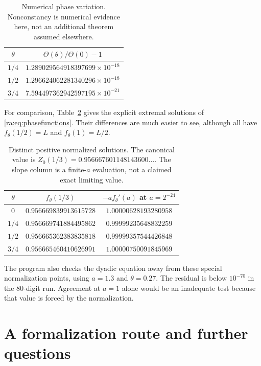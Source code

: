 \documentclass[11pt,a4paper,oneside,openany]{book}
\numberwithin{equation}{chapter}
\theoremstyle{definition}
\theoremstyle{remark}
\begin{document}
\begin{table}[htbp]
\centering
\begin{tabular}{cc}
\toprule
$\theta$ & $\Theta(\theta)/\Theta(0)-1$\\
\midrule
$1/4$ & $1.289029564918397699\times10^{-18}$\\
$1/2$ & $1.296624062281340296\times10^{-18}$\\
$3/4$ & $7.594497362942597195\times10^{-21}$\\
\bottomrule
\end{tabular}
\caption{Numerical phase variation. Nonconstancy is numerical evidence
here, not an additional theorem assumed elsewhere.}
\label{ra:tab:theta}
\end{table}

For comparison, Table~\ref{ra:tab:phases} gives the explicit extremal
solutions of \eqref{ra:eq:phasefunctions}. Their differences are much easier
to see, although all have $f_\theta(1/2)=L$ and
$f_\theta(1)=L/2$.

\begin{table}[htbp]
\centering
\begin{tabular}{ccc}
\toprule
$\theta$ & $f_\theta(1/3)$ & $-a f_\theta'(a)$ at $a=2^{-24}$\\
\midrule
$0$   & $0.956669839913615728$ & $1.00000628193280958$\\
$1/4$ & $0.956669741884495862$ & $0.99999235648832259$\\
$1/2$ & $0.956665362383835818$ & $0.99999357544426848$\\
$3/4$ & $0.956665460410626991$ & $1.00000750091845969$\\
\bottomrule
\end{tabular}
\caption{Distinct positive normalized solutions. The canonical value is
$Z_0(1/3)=0.956667601148143600\ldots$. The slope column is a finite-$a$
evaluation, not a claimed exact limiting value.}
\label{ra:tab:phases}
\end{table}

The program also checks the dyadic equation away from these special
normalization points, using $a=1.3$ and $\theta=0.27$.
The residual is below $10^{-70}$ in the 80-digit run.
Agreement at $a=1$ alone would be an inadequate test because that value
is forced by the normalization.

\chapter{A formalization route and further questions}
\label{dc:sec:route}
\end{document}
